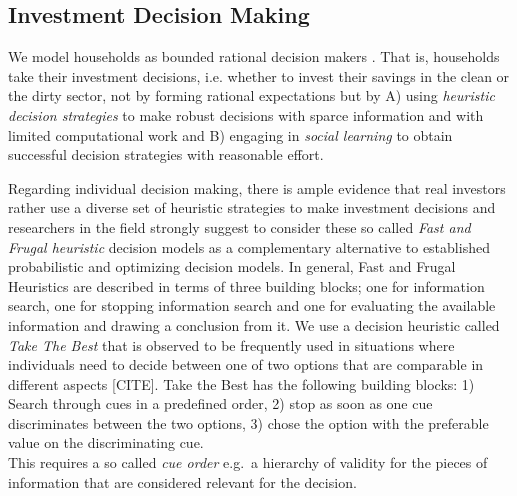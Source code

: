 \subsection{Investment Decision Making}
\label{sec:investment_decision_making}
We model households as bounded rational decision makers \cite{simon1972theories, simon1982models, gigerenzer2002bounded}.
That is, households take their investment decisions, i.e. whether to invest their savings in the clean or the dirty sector, not by forming rational expectations \cite{Evans2006, Kirman2014} but by A) using \emph{heuristic decision strategies} to make robust decisions with sparce information and with limited computational work and B) engaging in \emph{social learning} \cite{bandura1977} to obtain successful decision strategies \cite{Traulsen2010} with reasonable effort.

Regarding individual decision making, there is ample evidence that real investors rather use a diverse set of heuristic strategies to make investment decisions \cite{Gigerenzer2018} and researchers in the field strongly suggest to consider these so called \emph{Fast and Frugal heuristic} decision models as a complementary alternative to established probabilistic and optimizing decision models. 
In general, Fast and Frugal Heuristics are described in terms of three building blocks; one for information search, one for stopping information search and one for evaluating the available information and drawing a conclusion from it.
We use a decision heuristic called \emph{Take The Best} that is observed to be frequently used in situations where individuals need to decide between one of two options that are comparable in different aspects [CITE]. 
Take the Best has the following building blocks: 1) Search through cues in a predefined order, 2) stop as soon as one cue discriminates between the two options, 3) chose the option with the preferable value on the discriminating cue. \\
This requires a so called \textit{cue order} e.g.\ a hierarchy of validity for the pieces of information that are considered relevant for the decision. \\

